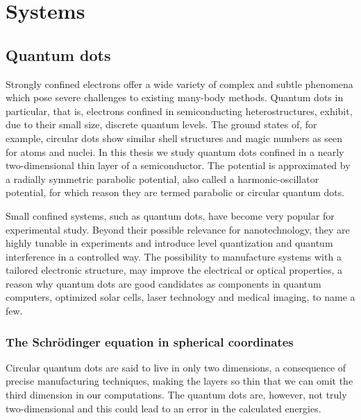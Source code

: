 \chapter{Systems}


\section{Quantum dots}
Strongly confined electrons offer a wide variety of complex and subtle phenomena which pose severe  challenges to existing many-body methods.
Quantum dots in particular, that is, electrons confined in semiconducting heterostructures, exhibit, due to their small size, discrete quantum levels. 
The ground states of, for example, circular dots show similar shell structures and magic numbers as seen for atoms and nuclei.
In this thesis we study quantum dots confined in a nearly two-dimensional thin layer of a semiconductor.
The potential is approximated by a radially symmetric parabolic potential, also called a harmonic-oscillator potential, for which reason they are termed parabolic or circular quantum dots.

Small confined systems, such as quantum dots, have become very popular for experimental 
study. 
Beyond their possible relevance for nanotechnology, they are highly tunable in experiments and introduce level quantization and quantum interference in a controlled way. 
The possibility to manufacture systems with a tailored electronic structure, may improve the electrical or optical properties, a reason why quantum dots are good candidates as components in quantum computers, optimized solar cells, laser technology and medical imaging, to name a few.



\subsection{The Schrödinger equation in spherical coordinates}
Circular quantum dots are said to live in only two dimensions, a consequence of precise manufacturing techniques, making the layers so thin that we can omit the third dimension in our computations.
The quantum dots are, however, not truly two-dimensional and this could lead to an error in the calculated energies.

